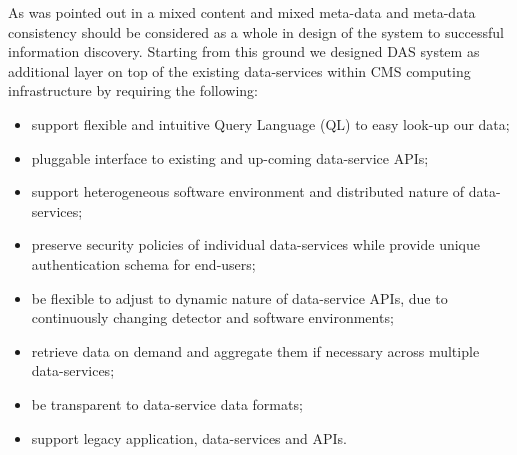 \documentclass[a4paper]{jpconf}
\begin{document}
As was pointed out in \cite{Arms} a mixed content and 
mixed meta-data and meta-data consistency should be considered as a whole in design 
of the system to successful information discovery. 
Starting from this ground we designed DAS system as
additional layer on top of the existing data-services
within CMS computing infrastructure by requiring the following:
\begin{itemize}
\item support flexible and intuitive Query Language (QL) to easy look-up our
data;
\item pluggable interface to existing and up-coming data-service APIs;
\item support heterogeneous software environment and distributed nature of data-services;
\item preserve security policies of individual data-services while provide unique
authentication schema for end-users;
\item be flexible to adjust to dynamic nature of data-service APIs, 
due to continuously changing detector and software environments;
\item retrieve data on demand and aggregate them if necessary across
multiple data-services;
\item be transparent to data-service data formats;
\item support legacy application, data-services and APIs.
\end{itemize}
\end{document}
